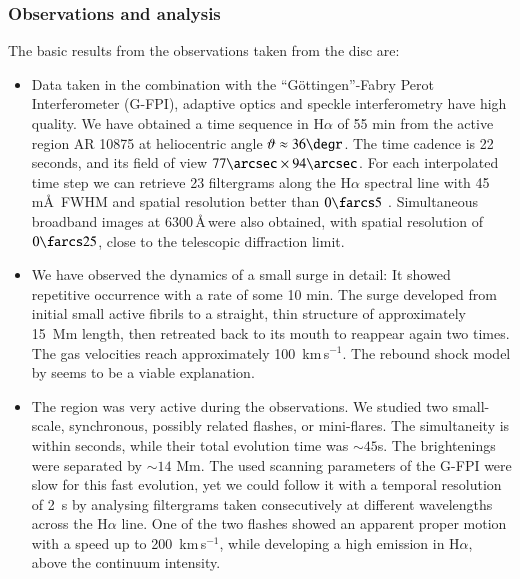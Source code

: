 \subsubsection*{Observations and analysis}
The basic results from the observations taken from the disc are:
\begin{itemize}
\item Data taken in the combination with the ``G\"ottingen''-Fabry Perot Interferometer (G-FPI), adaptive optics and speckle interferometry have high quality. We have obtained a time sequence in H$\alpha$ of 55 min from the active region AR 10875 at  heliocentric angle $\vartheta\approx36\degr$. The time cadence is 22 seconds, and its field of view  $77\arcsec\times94\arcsec$. For each interpolated time step we can retrieve 23 filtergrams along the H$\alpha$ spectral line with 45 m\AA\, FWHM and spatial resolution better than $0\farcs5$ . Simultaneous broadband images at 6300\,\AA\,were also obtained, with spatial resolution of $0\farcs25$, close to the telescopic diffraction limit.

\item We have observed the dynamics of a small surge in detail: It showed repetitive occurrence with a rate of some 10 min. The surge developed from initial small active fibrils to a straight, thin structure of approximately 15~Mm length, then retreated back to its mouth to reappear again two times. The gas velocities reach approximately 100~km\,s$^{-1}$. The rebound shock model by \citet{1989ApJ...343..985S} seems to be a viable explanation.

\item The region was very active during the observations. We studied two small-scale, synchronous, possibly related flashes, or mini-flares. The simultaneity is within seconds, while their total evolution time was $\sim45$s. The brightenings were separated by $\sim14$ Mm. The used scanning parameters of the G-FPI were slow for this fast evolution, yet we could follow it with a temporal resolution of 2~s by analysing filtergrams taken consecutively at different wavelengths across the H$\alpha$ line. One of the two flashes showed an apparent proper motion with a speed up to 200~km\,s$^{-1}$, while developing a high emission in H$\alpha$, above the continuum intensity.


\end{itemize}
